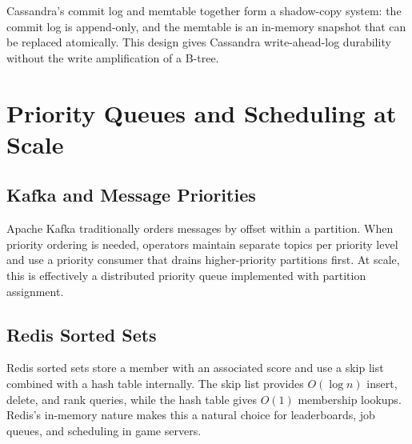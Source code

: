 Cassandra's commit log and memtable together form a shadow-copy system: the commit
log is append-only, and the memtable is an in-memory snapshot that can be replaced
atomically.  This design gives Cassandra write-ahead-log durability without the
write amplification of a B-tree.

\section{Priority Queues and Scheduling at Scale}

\subsection{Kafka and Message Priorities}

Apache Kafka traditionally orders messages by offset within a partition.  When
priority ordering is needed, operators maintain separate topics per priority level
and use a priority consumer that drains higher-priority partitions first.  At scale,
this is effectively a distributed priority queue implemented with partition
assignment.

\subsection{Redis Sorted Sets}

Redis sorted sets store a member with an associated score and use a skip list
combined with a hash table internally.  The skip list provides $O(\log n)$ insert,
delete, and rank queries, while the hash table gives $O(1)$ membership lookups.
Redis's in-memory nature makes this a natural choice for leaderboards, job queues,
and scheduling in game servers.

